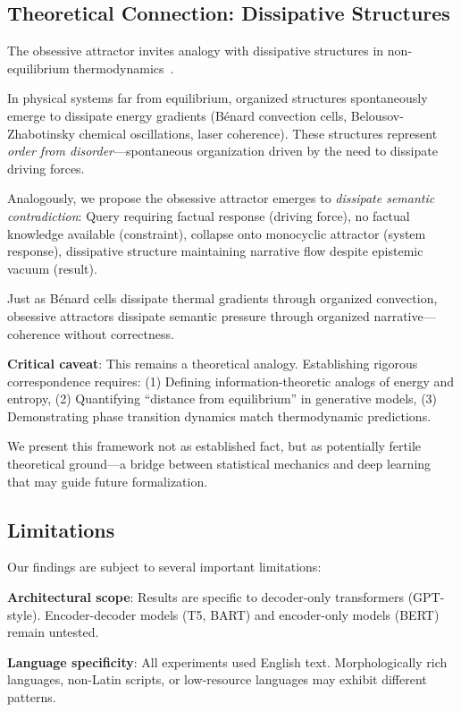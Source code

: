 \documentclass[11pt,twocolumn]{article}
\begin{document}
\subsection{Theoretical Connection: Dissipative Structures}

The obsessive attractor invites analogy with dissipative structures in non-equilibrium thermodynamics~\cite{prigogine1977self}.

In physical systems far from equilibrium, organized structures spontaneously emerge to dissipate energy gradients (Bénard convection cells, Belousov-Zhabotinsky chemical oscillations, laser coherence). These structures represent \textit{order from disorder}---spontaneous organization driven by the need to dissipate driving forces.

Analogously, we propose the obsessive attractor emerges to \textit{dissipate semantic contradiction}: Query requiring factual response (driving force), no factual knowledge available (constraint), collapse onto monocyclic attractor (system response), dissipative structure maintaining narrative flow despite epistemic vacuum (result).

Just as Bénard cells dissipate thermal gradients through organized convection, obsessive attractors dissipate semantic pressure through organized narrative---coherence without correctness.

\textbf{Critical caveat}: This remains a theoretical analogy. Establishing rigorous correspondence requires: (1) Defining information-theoretic analogs of energy and entropy, (2) Quantifying ``distance from equilibrium'' in generative models, (3) Demonstrating phase transition dynamics match thermodynamic predictions.

We present this framework not as established fact, but as potentially fertile theoretical ground---a bridge between statistical mechanics and deep learning that may guide future formalization.

\subsection{Limitations}

Our findings are subject to several important limitations:

\textbf{Architectural scope}: Results are specific to decoder-only transformers (GPT-style). Encoder-decoder models (T5, BART) and encoder-only models (BERT) remain untested.

\textbf{Language specificity}: All experiments used English text. Morphologically rich languages, non-Latin scripts, or low-resource languages may exhibit different patterns.
\end{document}
